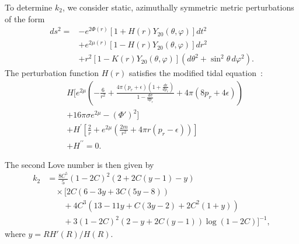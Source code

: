 \documentclass[prd,twocolumn,a4paper,floatfix,nofootinbib,preprintnumbers,superscriptaddress]{revtex4-1}
\begin{document}
To determine $k_2$, we consider static, azimuthally symmetric metric perturbations of the form
\begin{equation}
\begin{aligned}
ds^2 = & -e^{2\Phi(r)} \left[1 + H(r) Y_{20}(\theta, \varphi) \right] dt^2 \\
& + e^{2\mu(r)} \left[1 - H(r) Y_{20}(\theta, \varphi) \right] dr^2 \\
& + r^2 \left[1 - K(r) Y_{20}(\theta, \varphi) \right] \left(d\theta^2 + \sin^2\theta\, d\varphi^2 \right).
\end{aligned}
\end{equation}
The perturbation function $H(r)$ satisfies the modified tidal equation~\cite{Biswas:2019gkw,Rahmansyah:2020gar}:
\begin{equation}
\begin{aligned}
    &H\Bigg[e^{2\mu}\left(-\frac{6}{r^2} + \frac{4\pi(p_r + \epsilon)\left(1 + \frac{d\epsilon}{dp_r}\right)}{1 - \frac{d\sigma}{dp_r}} + 4\pi(8p_r + 4\epsilon)\right)\\ 
    &+ 16\pi\sigma e^{2\mu}- (\Phi')^2\Bigg]\\
    &+ H^\prime \left[\frac{2}{r} + e^{2\mu}\left(\frac{2m}{r^2} + 4\pi r(p_r - \epsilon)\right)\right]\\
    &+ H^{\prime\prime} = 0.
\end{aligned}
\label{eq:tov_lambda}
\end{equation}

The second Love number is then given by
\begin{equation}
\begin{aligned}
    k_2 &= \frac{8 C^5}{5} (1 - 2C)^2 \left(2 + 2C(y - 1) - y\right) \\
    &\quad \times \Big[2C \left(6 - 3y + 3C(5y - 8)\right) \\
    &\qquad + 4C^3 \left(13 - 11y + C(3y - 2) + 2C^2(1 + y)\right) \\
    &\qquad + 3(1 - 2C)^2 \left(2 - y + 2C(y - 1)\right) \log(1 - 2C)\Big]^{-1},
\end{aligned}
\end{equation}
where $y= R H'(R) / H(R)$.
\end{document}
